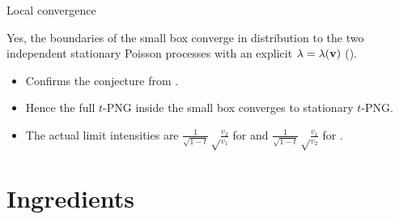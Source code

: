\documentclass[compress,xcolor=dvipsnames]{beamer}
\newcounter{l}
\begin{document}
\begin{frame}{Local convergence}
 \begin{theorem}
  Yes, the boundaries of the small box converge in distribution to the two independent stationary Poisson processes with an explicit \(\lambda=\lambda(\mathbf v)\) ().
 \end{theorem}
 \begin{itemize}
  \item<2-> Confirms the conjecture from .
  \item<3-> Hence the full \(t\)-PNG inside the small box converges to stationary \(t\)-PNG.
  \item<4-> The actual limit intensities are \(\frac1{\sqrt{1-t}}\sqrt\frac{v_2}{v_1}\) for  and \(\frac1{\sqrt{1-t}}\sqrt\frac{v_1}{v_2}\) for .
 \end{itemize}
\end{frame}

\section[Ingredients]{Ingredients}
\end{document}

